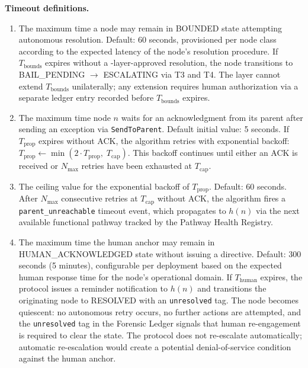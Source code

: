 \bigskip
\noindent\textbf{Timeout definitions.}

\begin{enumerate}
\item[\textbf{$T_{\text{bounds}}$ — Bounds Engine resolution timeout.}] The maximum time a node may remain in BOUNDED state attempting autonomous resolution. Default: 60 seconds, provisioned per node class according to the expected latency of the node's resolution procedure. If $T_{\text{bounds}}$ expires without a \fact-layer-approved resolution, the node transitions to BAIL\_PENDING $\rightarrow$ ESCALATING via T3 and T4. The \fact{} layer cannot extend $T_{\text{bounds}}$ unilaterally; any extension requires human authorization via a separate ledger entry recorded before $T_{\text{bounds}}$ expires.

\item[\textbf{$T_{\text{prop}}$ — Per-hop propagation timeout.}] The maximum time node $n$ waits for an acknowledgment from its parent after sending an exception via \texttt{SendToParent}. Default initial value: 5 seconds. If $T_{\text{prop}}$ expires without ACK, the algorithm retries with exponential backoff: $T_{\text{prop}} \leftarrow \min(2 \cdot T_{\text{prop}},\; T_{\text{cap}})$. This backoff continues until either an ACK is received or $N_{\max}$ retries have been exhausted at $T_{\text{cap}}$.

\item[\textbf{$T_{\text{cap}}$ — Maximum propagation timeout value.}] The ceiling value for the exponential backoff of $T_{\text{prop}}$. Default: 60 seconds. After $N_{\max}$ consecutive retries at $T_{\text{cap}}$ without ACK, the algorithm fires a \texttt{parent\_unreachable} timeout event, which propagates to $h(n)$ via the next available functional pathway tracked by the Pathway Health Registry.

\item[\textbf{$T_{\text{human}}$ — Human acknowledgment timeout.}] The maximum time the human anchor may remain in HUMAN\_ACKNOWLEDGED state without issuing a directive. Default: 300 seconds (5 minutes), configurable per deployment based on the expected human response time for the node's operational domain. If $T_{\text{human}}$ expires, the protocol issues a reminder notification to $h(n)$ and transitions the originating node to RESOLVED with an \texttt{unresolved} tag. The node becomes quiescent: no autonomous retry occurs, no further actions are attempted, and the \texttt{unresolved} tag in the Forensic Ledger signals that human re-engagement is required to clear the state. The protocol does not re-escalate automatically; automatic re-escalation would create a potential denial-of-service condition against the human anchor.
\end{enumerate}

